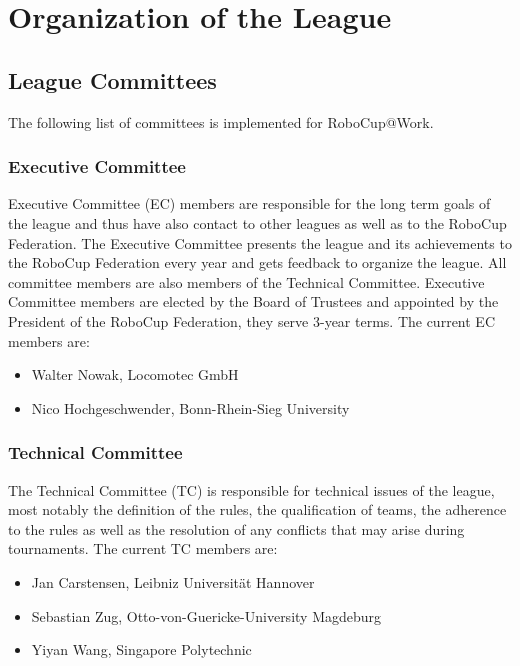 \section{Organization of the League}\label{sec:organisation_of_the_league}

\subsection{League Committees}
The following list of committees is implemented for RoboCup@Work.

\subsubsection{Executive Committee}

Executive Committee (EC) members are responsible for the long term goals of the league and thus have also contact to other leagues as well as to the RoboCup Federation. The Executive Committee presents the league and its achievements to the RoboCup Federation every year and gets feedback to organize the league. All committee members are also members of the Technical Committee. Executive Committee members are elected by the Board of Trustees and appointed by the President of the RoboCup Federation, they serve 3-year terms. The current EC members are:

\begin{itemize}
	\item Walter Nowak, Locomotec GmbH
	\item Nico Hochgeschwender, Bonn-Rhein-Sieg University
\end{itemize}


\subsubsection{Technical Committee}
The Technical Committee (TC) is responsible for technical issues of the league, most notably the definition of the rules, the qualification of teams, the adherence to the rules as well as the resolution of any conflicts that may arise during tournaments. The current TC members are:

\begin{itemize}
	\item Jan Carstensen, Leibniz Universit\"at Hannover
	\item Sebastian Zug, Otto-von-Guericke-University Magdeburg
	\item Yiyan Wang, Singapore Polytechnic
\end{itemize}


